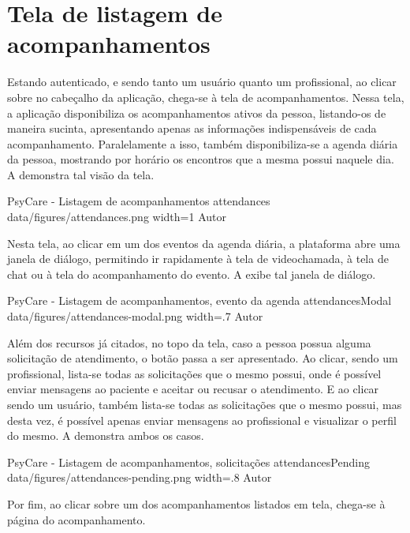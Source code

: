 \section{Tela de listagem de acompanhamentos}
\label{sec:acompanhamentos}

Estando autenticado, e sendo tanto um usuário quanto um profissional, ao clicar sobre  no cabeçalho da aplicação, chega-se à tela de acompanhamentos. Nessa tela, a aplicação disponibiliza os acompanhamentos ativos da pessoa, listando-os de maneira sucinta, apresentando apenas as informações indispensáveis de cada acompanhamento. Paralelamente a isso, também disponibiliza-se a agenda diária da pessoa, mostrando por horário os encontros que a mesma possui naquele dia. A  demonstra tal visão da tela.

\image
    {PsyCare - Listagem de acompanhamentos}
    {attendances}
    {data/figures/attendances.png}
    {width=1\textwidth}
    {Autor}

Nesta tela, ao clicar em um dos eventos da agenda diária, a plataforma abre uma janela de diálogo, permitindo ir rapidamente à tela de videochamada, à tela de chat ou à tela do acompanhamento do evento. A  exibe tal janela de diálogo.

\image
    {PsyCare - Listagem de acompanhamentos, evento da agenda}
    {attendancesModal}
    {data/figures/attendances-modal.png}
    {width=.7\textwidth}
    {Autor}

Além dos recursos já citados, no topo da tela, caso a pessoa possua alguma solicitação de atendimento, o botão  passa a ser apresentado. Ao clicar, sendo um profissional, lista-se todas as solicitações que o mesmo possui, onde é possível enviar mensagens ao paciente e aceitar ou recusar o atendimento. E ao clicar sendo um usuário, também lista-se todas as solicitações que o mesmo possui, mas desta vez, é possível apenas enviar mensagens ao profissional e visualizar o perfil do mesmo. A  demonstra ambos os casos.

\image
    {PsyCare - Listagem de acompanhamentos, solicitações}
    {attendancesPending}
    {data/figures/attendances-pending.png}
    {width=.8\textwidth}
    {Autor}

Por fim, ao clicar sobre um dos acompanhamentos listados em tela, chega-se à página do acompanhamento.